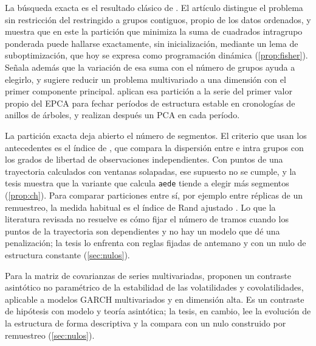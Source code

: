 La búsqueda exacta es el resultado clásico de \textcite{fisher_1958}. El artículo distingue el
problema sin restricción del restringido a grupos contiguos, propio de los datos ordenados, y
muestra que en este la partición que minimiza la suma de cuadrados intragrupo ponderada puede
hallarse exactamente, sin inicialización, mediante un lema de suboptimización, que hoy se expresa
como programación dinámica (\cref{prop:fisher}). Señala además que la variación de esa suma con el
número de grupos ayuda a elegirlo, y sugiere reducir un problema multivariado a una dimensión con
el primer componente principal. \textcite{camiz_roig_2011} aplican esa
partición a la serie del primer valor propio del EPCA para fechar períodos de estructura estable
en cronologías de anillos de árboles, y realizan después un PCA en cada período.

La partición exacta deja abierto el número de segmentos. El criterio que usan los antecedentes es
el índice de \textcite{calinski_harabasz_1974}, que compara la
dispersión entre e intra grupos con los grados de libertad de observaciones independientes. Con
puntos de una trayectoria calculados con ventanas solapadas, ese supuesto no se cumple, y la
tesis muestra que la variante que calcula \texttt{aede} tiende a elegir más segmentos
(\cref{prop:ch}). Para comparar particiones entre sí, por ejemplo entre réplicas de un remuestreo,
la medida habitual es el índice de Rand ajustado
\parencite{hubert_arabie_1985}. Lo que la literatura
revisada no resuelve es cómo fijar el número de tramos cuando los puntos de la trayectoria son
dependientes y no hay un modelo que dé una penalización; la tesis lo enfrenta con reglas fijadas
de antemano y con un nulo de estructura constante (\cref{sec:nulos}).

Para la matriz de covarianzas de series multivariadas, \textcite{aue_et_al_2009} proponen un contraste asintótico no paramétrico de la estabilidad de las volatilidades
y covolatilidades, aplicable a modelos GARCH multivariados y en dimensión alta. Es un contraste de
hipótesis con modelo y teoría asintótica; la tesis, en cambio, lee la evolución de la estructura
de forma descriptiva y la compara con un nulo construido por remuestreo (\cref{sec:nulos}).

